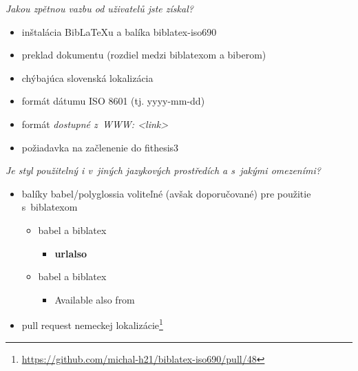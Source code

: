 \documentclass{beamer}
\newcommand{\xmark}{\ding{55}}%
\begin{document}
\begin{frame}
\emph{Jakou zpětnou vazbu od uživatelů jste získal?}
\medskip\par
\begin{itemize}
\item[\checkmark] inštalácia BibLaTeXu a balíka \textsf{biblatex-iso690}
\item[\checkmark] preklad dokumentu (rozdiel medzi \textsf{biblatexom} a \textsf{biberom})
\item[\checkmark] chýbajúca slovenská lokalizácia
\item[\checkmark] formát dátumu ISO 8601 (tj. yyyy-mm-dd)
\item[\checkmark] formát \emph{dostupné z~WWW: <link>}
\item[\checkmark] požiadavka na začlenenie do \textsf{fithesis3}
\end{itemize}
\end{frame}

\begin{frame}
\emph{Je styl použitelný i v~jiných jazykových prostředích a s~jakými omezeními?}
\medskip\par
\begin{itemize}
\item balíky \textsf{babel}/\textsf{polyglossia} voliteľné (avšak doporučované) pre použitie s~\textsf{biblatexom}
  \begin{itemize}
  \item \checkmark{} \textsf{babel} a \xmark{} \textsf{biblatex}
    \begin{itemize}
    \item \textbf{urlalso}
    \end{itemize}
  \item \xmark{} \textsf{babel} a \xmark{} \textsf{biblatex}
    \begin{itemize}
    \item Available also from
    \end{itemize}
  \end{itemize}
\item pull request nemeckej lokalizácie\footnote[frame]{\url{https://github.com/michal-h21/biblatex-iso690/pull/48}}
\end{itemize}
\end{frame}
\end{document}
